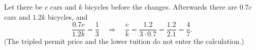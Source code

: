 Let there be $c$ cars and $k$ bicycles before the changes. Afterwards there are $0.7c$ cars and $1.2k$ bicycles, and
\[
\dfrac{0.7c}{1.2k}=\dfrac{1}{3}\quad\Longrightarrow\quad\dfrac {c}{k}=\dfrac{1.2}{3\cdot0.7}=\dfrac{1.2}{2.1}=\boxed{\dfrac{4}{7}}.
\]
(The tripled permit price and the lower tuition do not enter the calculation.)

